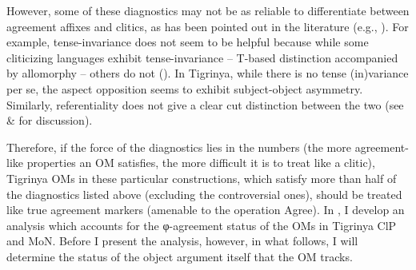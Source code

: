 \documentclass[output=paper]{langscibook}
\begin{document}
\begin{table}
\caption{Distinguishing pronominal clitics \& agreement markers\label{tab:Gebregziabher:Table5}}
\end{table}


However, some of these diagnostics may not be as reliable to differentiate between agreement affixes and clitics, as has been pointed out in the literature (e.g., \citealt{ana17}). For example, tense-invariance does not seem to be helpful because while some cliticizing languages exhibit tense-invariance -- T-based distinction accompanied by allomorphy -- others do not (\citealt{harizanov14}). In Tigrinya, while there is no tense (in)variance per se, the aspect opposition seems to exhibit subject-object asymmetry. Similarly, referentiality does not give a clear cut distinction between the two (see \citealt{ana17} \& \citealt{sport18} for discussion). 

Therefore, if the force of the diagnostics lies in the numbers (the more agree\-ment-like properties an OM satisfies, the more difficult it is to treat like a clitic), Tigrinya OMs in these particular constructions, which satisfy more than half of the diagnostics listed above (excluding the controversial ones), should be treated like true agreement markers (amenable to the operation Agree). In , I develop an analysis which accounts for the φ-agreement status of the OMs in Tigrinya ClP and MoN. Before I present the analysis, however, in what follows, I will determine the status of the object argument itself that the OM tracks.
\end{document}
